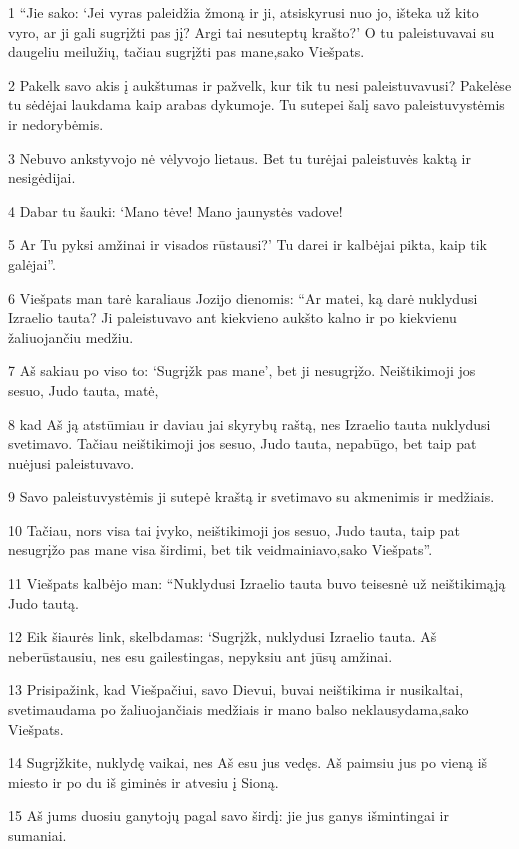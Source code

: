 \par 1 “Jie sako: ‘Jei vyras paleidžia žmoną ir ji, atsiskyrusi nuo jo, išteka už kito vyro, ar ji gali sugrįžti pas jį? Argi tai nesuteptų krašto?’ O tu paleistuvavai su daugeliu meilužių, tačiau sugrįžti pas mane,­sako Viešpats.­ 
\par 2 Pakelk savo akis į aukštumas ir pažvelk, kur tik tu nesi paleistuvavusi? Pakelėse tu sėdėjai laukdama kaip arabas dykumoje. Tu sutepei šalį savo paleistuvystėmis ir nedorybėmis. 
\par 3 Nebuvo ankstyvojo nė vėlyvojo lietaus. Bet tu turėjai paleistuvės kaktą ir nesigėdijai. 
\par 4 Dabar tu šauki: ‘Mano tėve! Mano jaunystės vadove! 
\par 5 Ar Tu pyksi amžinai ir visados rūstausi?’ Tu darei ir kalbėjai pikta, kaip tik galėjai”. 
\par 6 Viešpats man tarė karaliaus Jozijo dienomis: “Ar matei, ką darė nuklydusi Izraelio tauta? Ji paleistuvavo ant kiekvieno aukšto kalno ir po kiekvienu žaliuojančiu medžiu. 
\par 7 Aš sakiau po viso to: ‘Sugrįžk pas mane’, bet ji nesugrįžo. Neištikimoji jos sesuo, Judo tauta, matė, 
\par 8 kad Aš ją atstūmiau ir daviau jai skyrybų raštą, nes Izraelio tauta nuklydusi svetimavo. Tačiau neištikimoji jos sesuo, Judo tauta, nepabūgo, bet taip pat nuėjusi paleistuvavo. 
\par 9 Savo paleistuvystėmis ji sutepė kraštą ir svetimavo su akmenimis ir medžiais. 
\par 10 Tačiau, nors visa tai įvyko, neištikimoji jos sesuo, Judo tauta, taip pat nesugrįžo pas mane visa širdimi, bet tik veidmainiavo,­sako Viešpats”. 
\par 11 Viešpats kalbėjo man: “Nuklydusi Izraelio tauta buvo teisesnė už neištikimąją Judo tautą. 
\par 12 Eik šiaurės link, skelbdamas: ‘Sugrįžk, nuklydusi Izraelio tauta. Aš neberūstausiu, nes esu gailestingas, nepyksiu ant jūsų amžinai. 
\par 13 Prisipažink, kad Viešpačiui, savo Dievui, buvai neištikima ir nusikaltai, svetimaudama po žaliuojančiais medžiais ir mano balso neklausydama,­sako Viešpats.­ 
\par 14 Sugrįžkite, nuklydę vaikai, nes Aš esu jus vedęs. Aš paimsiu jus po vieną iš miesto ir po du iš giminės ir atvesiu į Sioną. 
\par 15 Aš jums duosiu ganytojų pagal savo širdį: jie jus ganys išmintingai ir sumaniai. 
